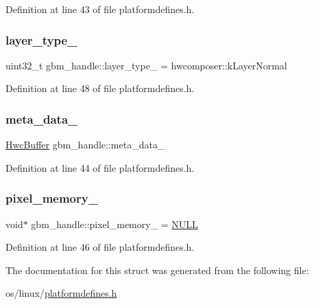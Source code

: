 Definition at line 43 of file platformdefines.\+h.

\mbox{\label{structgbm__handle_aeaaf0fd4477abfe406de45109d6af33c}} 
\subsubsection{\texorpdfstring{layer\+\_\+type\+\_\+}{layer\_type\_}}
{\footnotesize\ttfamily uint32\+\_\+t gbm\+\_\+handle\+::layer\+\_\+type\+\_\+ = hwcomposer\+::k\+Layer\+Normal}



Definition at line 48 of file platformdefines.\+h.

\mbox{\label{structgbm__handle_a2d3bce2c387abbf976b37d52b272ebbe}} 
\subsubsection{\texorpdfstring{meta\+\_\+data\+\_\+}{meta\_data\_}}
{\footnotesize\ttfamily \mbox{\hyperlink{structHwcBuffer}{Hwc\+Buffer}} gbm\+\_\+handle\+::meta\+\_\+data\+\_\+}



Definition at line 44 of file platformdefines.\+h.

\mbox{\label{structgbm__handle_ade4ce7c6a2df0e1e351af03309098005}} 
\subsubsection{\texorpdfstring{pixel\+\_\+memory\+\_\+}{pixel\_memory\_}}
{\footnotesize\ttfamily void$\ast$ gbm\+\_\+handle\+::pixel\+\_\+memory\+\_\+ = \mbox{\hyperlink{alios_2platformdefines_8h_a070d2ce7b6bb7e5c05602aa8c308d0c4}{N\+U\+LL}}}



Definition at line 46 of file platformdefines.\+h.



The documentation for this struct was generated from the following file\+:\begin{DoxyCompactItemize}
\item 
os/linux/\mbox{\hyperlink{linux_2platformdefines_8h}{platformdefines.\+h}}\end{DoxyCompactItemize}

